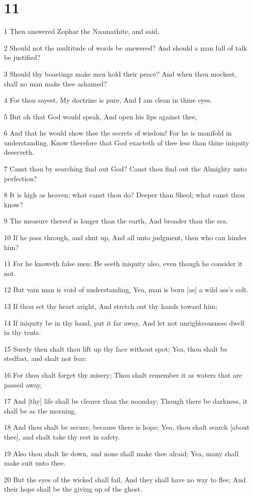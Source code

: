 \chapter{11}

\par 1 Then answered Zophar the Naamathite, and said,
\par 2 Should not the multitude of words be answered? And should a man full of talk be justified?
\par 3 Should thy boastings make men hold their peace? And when thou mockest, shall no man make thee ashamed?
\par 4 For thou sayest, My doctrine is pure, And I am clean in thine eyes.
\par 5 But oh that God would speak, And open his lips against thee,
\par 6 And that he would show thee the secrets of wisdom! For he is manifold in understanding. Know therefore that God exacteth of thee less than thine iniquity deserveth.
\par 7 Canst thou by searching find out God? Canst thou find out the Almighty unto perfection?
\par 8 It is high as heaven; what canst thou do? Deeper than Sheol; what canst thou know?
\par 9 The measure thereof is longer than the earth, And broader than the sea.
\par 10 If he pass through, and shut up, And all unto judgment, then who can hinder him?
\par 11 For he knoweth false men: He seeth iniquity also, even though he consider it not.
\par 12 But vain man is void of understanding, Yea, man is born [as] a wild ass's colt.
\par 13 If thou set thy heart aright, And stretch out thy hands toward him;
\par 14 If iniquity be in thy hand, put it far away, And let not unrighteousness dwell in thy tents.
\par 15 Surely then shalt thou lift up thy face without spot; Yea, thou shalt be stedfast, and shalt not fear:
\par 16 For thou shalt forget thy misery; Thou shalt remember it as waters that are passed away,
\par 17 And [thy] life shall be clearer than the noonday; Though there be darkness, it shall be as the morning.
\par 18 And thou shalt be secure, because there is hope; Yea, thou shalt search [about thee], and shalt take thy rest in safety.
\par 19 Also thou shalt lie down, and none shall make thee afraid; Yea, many shall make suit unto thee.
\par 20 But the eyes of the wicked shall fail, And they shall have no way to flee; And their hope shall be the giving up of the ghost.


